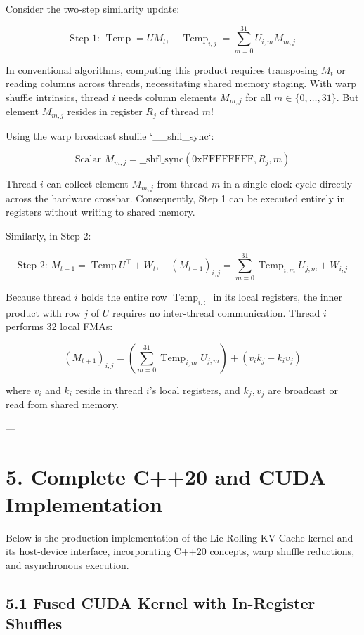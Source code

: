 \documentclass[11pt,twoside,openright]{amsbook}
\begin{document}
{{{{{{{Consider the two-step similarity update:

$$\text{Step 1: } \operatorname{Temp} = U M_t, \quad \operatorname{Temp}_{i, j} = \sum_{m=0}^{31} U_{i, m} M_{m, j}$$

In conventional algorithms, computing this product requires transposing $M_t$ or reading columns across threads, necessitating shared memory staging. With warp shuffle intrinsics, thread $i$ needs column elements $M_{m, j}$ for all $m \in \{0, \dots, 31\}$. But element $M_{m, j}$ resides in register $R_j$ of thread $m$!

Using the warp broadcast shuffle `__shfl_sync`:

$$\text{Scalar } M_{m, j} = \text{\_\_shfl\_sync}(0\text{xFFFFFFFF}, R_j, m)$$

Thread $i$ can collect element $M_{m, j}$ from thread $m$ in a single clock cycle directly across the hardware crossbar. Consequently, Step 1 can be executed entirely in registers without writing to shared memory.

Similarly, in Step 2:

$$\text{Step 2: } M_{t+1} = \operatorname{Temp} U^\top + W_t, \quad (M_{t+1})_{i, j} = \sum_{m=0}^{31} \operatorname{Temp}_{i, m} U_{j, m} + W_{i, j}$$

Because thread $i$ holds the entire row $\operatorname{Temp}_{i, :}$ in its local registers, the inner product with row $j$ of $U$ requires no inter-thread communication. Thread $i$ performs 32 local FMAs:

$$(M_{t+1})_{i, j} = \left( \sum_{m=0}^{31} \operatorname{Temp}_{i, m} U_{j, m} \right) + (v_i k_j - k_i v_j)$$

where $v_i$ and $k_i$ reside in thread $i$'s local registers, and $k_j, v_j$ are broadcast or read from shared memory.

---

\section{5. Complete C++20 and CUDA Implementation}

Below is the production implementation of the Lie Rolling KV Cache kernel and its host-device interface, incorporating C++20 concepts, warp shuffle reductions, and asynchronous execution.

\subsection{5.1 Fused CUDA Kernel with In-Register Shuffles}

}}}}}}}
\end{document}
